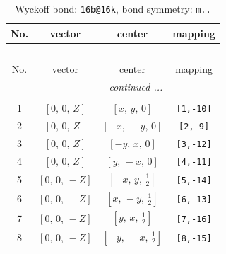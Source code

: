 \documentclass[fleqn,8pt]{jsarticle}
\begin{document}
\begin{longtable}{cccc}
\caption{Wyckoff bond: {\tt 16b@16k}, bond symmetry: {\tt m..}}
 \\
 \hline \hline
No. & vector & center & mapping \\ \hline \endfirsthead

\multicolumn{3}{l}{\tablename\ \thetable{}} \\
 \hline \hline
No. & vector & center & mapping \\ \hline \endhead

 \hline \hline
\multicolumn{3}{r}{\footnotesize\it continued ...} \\ \endfoot

 \hline \hline
\multicolumn{3}{r}{} \\ \endlastfoot

1 & $\left[ 0,\, 0,\, Z \right]$ & $\left[ x,\, y,\, 0 \right]$ & {\tt [1,-10]} \\ \hline
2 & $\left[ 0,\, 0,\, Z \right]$ & $\left[ - x,\, - y,\, 0 \right]$ & {\tt [2,-9]} \\ \hline
3 & $\left[ 0,\, 0,\, Z \right]$ & $\left[ - y,\, x,\, 0 \right]$ & {\tt [3,-12]} \\ \hline
4 & $\left[ 0,\, 0,\, Z \right]$ & $\left[ y,\, - x,\, 0 \right]$ & {\tt [4,-11]} \\ \hline
5 & $\left[ 0,\, 0,\, - Z \right]$ & $\left[ - x,\, y,\, \frac{1}{2} \right]$ & {\tt [5,-14]} \\ \hline
6 & $\left[ 0,\, 0,\, - Z \right]$ & $\left[ x,\, - y,\, \frac{1}{2} \right]$ & {\tt [6,-13]} \\ \hline
7 & $\left[ 0,\, 0,\, - Z \right]$ & $\left[ y,\, x,\, \frac{1}{2} \right]$ & {\tt [7,-16]} \\ \hline
8 & $\left[ 0,\, 0,\, - Z \right]$ & $\left[ - y,\, - x,\, \frac{1}{2} \right]$ & {\tt [8,-15]} \\
\end{longtable}
\renewcommand{\arraystretch}{1.2}
\end{document}
